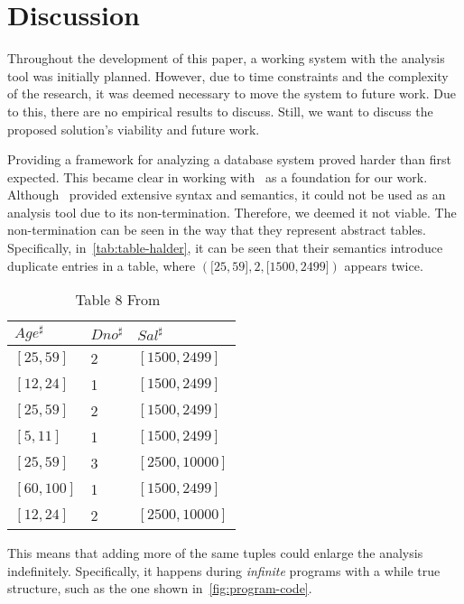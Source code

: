 \section{Discussion}\label{sec:discussion}
Throughout the development of this paper, a working system with the analysis tool was initially planned.
However, due to time constraints and the complexity of the research, it was deemed necessary to move the system to future work.
Due to this, there are no empirical results to discuss. Still, we want to discuss the proposed solution's viability and future work.


Providing a framework for analyzing a database system proved harder than first expected.
This became clear in working with~\cite{halder_abstract_2012} as a foundation for our work.
Although~\cite{halder_abstract_2012} provided extensive syntax and semantics, it could not be used as an analysis tool due to its non-termination. Therefore, we deemed it not viable.
The non-termination can be seen in the way that they represent abstract tables.
Specifically, in~\autoref{tab:table-halder}, it can be seen that their semantics introduce duplicate entries in a table, where $({[}25,59{]},2,{[}1500,2499{]})$ appears twice.




\begin{table}
    \renewcommand{\arraystretch}{1.3}
    \centering
    \caption{Table 8 From~\cite{halder_abstract_2012}}
    \begin{tabular}{lll}
        \toprule
        $Age^\sharp$ & $Dno^\sharp$ & $Sal^\sharp$   \\ \midrule
        $[25,59]$    & 2            & $[1500,2499]$  \\
        $[12,24]$    & 1            & $[1500,2499]$  \\
        $[25,59]$    & 2            & $[1500,2499]$  \\
        $[5,11]$     & 1            & $[1500,2499]$  \\
        $[25,59]$    & 3            & $[2500,10000]$ \\
        $[60,100]$   & 1            & $[1500,2499]$  \\
        $[12,24]$    & 2            & $[2500,10000]$ \\ \bottomrule
    \end{tabular}\label{tab:table-halder}
\end{table}
This means that adding more of the same tuples could enlarge the analysis indefinitely.
Specifically, it happens during \textit{infinite} programs with a while true structure, such as the one shown in~\autoref{fig:program-code}.


